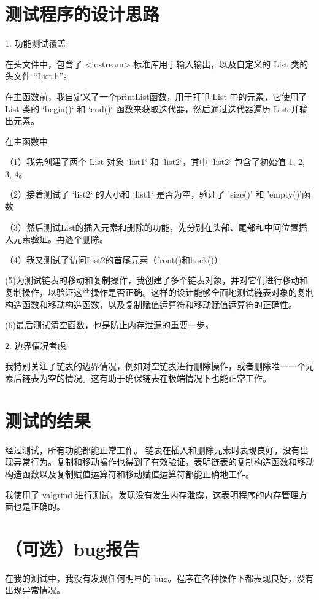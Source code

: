 \documentclass[UTF8]{ctexart}
\begin{document}
\pagestyle{fancy}
\fancyhead{}


\section{测试程序的设计思路}  

1. 功能测试覆盖:  
    
    在头文件中，包含了 <iostream> 标准库用于输入输出，以及自定义的 List 类的头文件 “List.h”。
    
    在主函数前，我自定义了一个printList函数，用于打印 List 中的元素，它使用了 List 类的 `begin()` 和 `end()` 函数来获取迭代器，然后通过迭代器遍历 List 并输出元素。
    
    在主函数中
    
        （1）我先创建了两个 List 对象 `list1` 和 `list2`，其中 `list2` 包含了初始值 1, 2, 3, 4。
        
        （2）接着测试了 `list2` 的大小和 `list1` 是否为空，验证了 'size()' 和 'empty()'函数

        （3）然后测试List的插入元素和删除的功能，先分别在头部、尾部和中间位置插入元素验证。再逐个删除。

        （4）我又测试了访问List2的首尾元素（front()和back()）

        (5)为测试链表的移动和复制操作，我创建了多个链表对象，并对它们进行移动和复制操作，以验证这些操作是否正确。这样的设计能够全面地测试链表对象的复制构造函数和移动构造函数，以及复制赋值运算符和移动赋值运算符的正确性。

        (6)最后测试清空函数，也是防止内存泄漏的重要一步。
  
2. 边界情况考虑:  

    我特别关注了链表的边界情况，例如对空链表进行删除操作，或者删除唯一一个元素后链表为空的情况。这有助于确保链表在极端情况下也能正常工作。  


\section{测试的结果}

经过测试，所有功能都能正常工作。
链表在插入和删除元素时表现良好，没有出现异常行为。复制和移动操作也得到了有效验证，表明链表的复制构造函数和移动构造函数以及复制赋值运算符和移动赋值运算符都能正确地工作。  
  
我使用了 valgrind 进行测试，发现没有发生内存泄露，这表明程序的内存管理方面也是正确的。  

\section{（可选）bug报告}

在我的测试中，我没有发现任何明显的 bug。程序在各种操作下都表现良好，没有出现异常情况。
\end{document}
